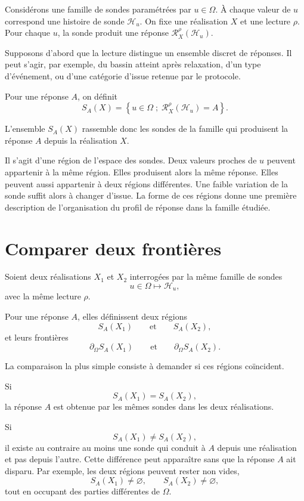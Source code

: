 Considérons une famille de sondes paramétrées par $u\in\Omega$. À chaque valeur de $u$ correspond une histoire de sonde \(\mathcal H_u\). On fixe une réalisation $X$ et une lecture $\rho$. Pour chaque $u$, la sonde produit une réponse \(\mathcal R_X^\rho(\mathcal H_u)\).

Supposons d'abord que la lecture distingue un ensemble discret de réponses. Il peut s'agir, par exemple, du bassin atteint après relaxation, d'un type d'événement, ou d'une catégorie d'issue retenue par le protocole.

Pour une réponse $A$, on définit
\[
S_A(X)
=
\left\{
u\in\Omega
\; ; \;
\mathcal R_X^\rho(\mathcal H_u)=A
\right\}.
\]

L'ensemble $S_A(X)$ rassemble donc les sondes de la famille qui produisent la réponse $A$ depuis la réalisation $X$.

Il s'agit d'une région de l'espace des sondes. Deux valeurs proches de $u$ peuvent appartenir à la même région. Elles produisent alors la même réponse. Elles peuvent aussi appartenir à deux régions différentes. Une faible variation de la sonde suffit alors à changer d'issue. La forme de ces régions donne une première description de l'organisation du profil de réponse dans la famille étudiée.

\section{Comparer deux frontières}
\label{t3-comparer-deux-frontieres}

Soient deux réalisations $X_1$ et $X_2$ interrogées par la même famille
de sondes
\[
u\in\Omega
\longmapsto
\mathcal H_u,
\]
avec la même lecture $\rho$.

Pour une réponse $A$, elles définissent deux régions
\[
S_A(X_1)
\qquad\text{et}\qquad
S_A(X_2),
\]
et leurs frontières
\[
\partial_\Omega S_A(X_1)
\qquad\text{et}\qquad
\partial_\Omega S_A(X_2).
\]

La comparaison la plus simple consiste à demander si ces régions coïncident.

Si
\[
S_A(X_1)=S_A(X_2),
\]
la réponse $A$ est obtenue par les mêmes sondes dans les deux réalisations.

Si
\[
S_A(X_1)\neq S_A(X_2),
\]
il existe au contraire au moins une sonde qui conduit à $A$ depuis une réalisation et pas depuis l'autre. Cette différence peut apparaître sans que la réponse $A$ ait disparu.
Par exemple, les deux régions peuvent rester non vides,
\[
S_A(X_1)\neq\varnothing,
\qquad
S_A(X_2)\neq\varnothing,
\]
tout en occupant des parties différentes de $\Omega$.

